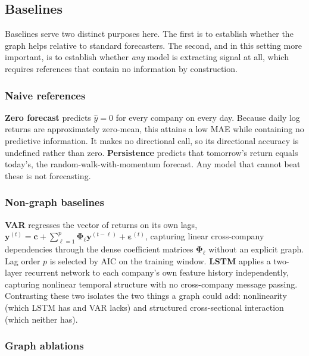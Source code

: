\subsection{Baselines}

Baselines serve two distinct purposes here. The first is to establish whether the graph helps relative to standard forecasters. The second, and in this setting more important, is to establish whether \emph{any} model is extracting signal at all, which requires references that contain no information by construction.

\subsubsection{Naive references}

\textbf{Zero forecast} predicts $\hat{y} = 0$ for every company on every day. Because daily log returns are approximately zero-mean, this attains a low MAE while containing no predictive information. It makes no directional call, so its directional accuracy is undefined rather than zero. \textbf{Persistence} predicts that tomorrow's return equals today's, the random-walk-with-momentum forecast. Any model that cannot beat these is not forecasting.

\subsubsection{Non-graph baselines}

\textbf{VAR} \parencite{sims1980macroeconomics} regresses the vector of returns on its own lags, $\mathbf{y}^{(t)} = \mathbf{c} + \sum_{\ell=1}^{p} \mathbf{\Phi}_\ell \mathbf{y}^{(t-\ell)} + \boldsymbol{\varepsilon}^{(t)}$, capturing linear cross-company dependencies through the dense coefficient matrices $\mathbf{\Phi}_\ell$ without an explicit graph. Lag order $p$ is selected by AIC on the training window. \textbf{LSTM} \parencite{hochreiter1997lstm} applies a two-layer recurrent network to each company's own feature history independently, capturing nonlinear temporal structure with no cross-company message passing. Contrasting these two isolates the two things a graph could add: nonlinearity (which LSTM has and VAR lacks) and structured cross-sectional interaction (which neither has).

\subsubsection{Graph ablations}

